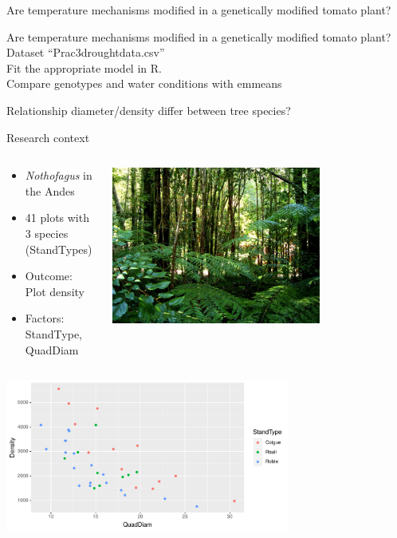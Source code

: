 \documentclass{beamer}
\begin{document}
\begin{frame}{Are temperature mechanisms modified in a genetically modified tomato plant?}
\end{frame}

\begin{frame}{Are temperature mechanisms modified in a genetically modified tomato plant?}
 Dataset ``Prac3droughtdata.csv''\\
 Fit the appropriate model in R.\\
 Compare genotypes and water conditions with emmeans
 
\end{frame}

\begin{frame}{Relationship diameter/density differ between tree species?}
 
  \begin{block}{Research context}
 \begin{columns}
  \begin{column}{0.6\textwidth}
   \begin{itemize}
    \item \textit{Nothofagus} in the Andes
    \item 41 plots with 3 species (StandTypes)
    \item Outcome: Plot density
    \item Factors: StandType, QuadDiam
   \end{itemize}
  \end{column}
  \begin{column}{0.4\textwidth}
    \includegraphics[width=0.7\textwidth]{Figures/forest}
  \end{column}

 \end{columns}
 \end{block}
 
 \pause
 \includegraphics[width=0.7\textwidth]{Figures/trees}
 
\end{frame}
\end{document}
